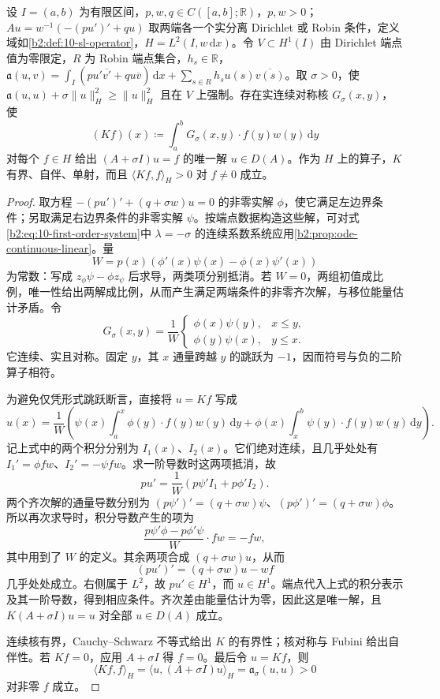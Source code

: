\begin{proposition}[移位 Green 算子]\label{b2:prop:10-green-resolvent}
设 \(I=(a,b)\) 为有限区间，\(p,w,q\in C([a,b];\mathbb R)\)，\(p,w>0\)；\(Au=w^{-1}(-(pu')'+qu)\) 取两端各一个实分离 Dirichlet 或 Robin 条件，定义域如\cref{b2:def:10-sl-operator}，\(H=L^2(I,w\,\mathrm dx)\)。令 \(V\subset H^1(I)\) 由 Dirichlet 端点值为零限定，\(R\) 为 Robin 端点集合，\(h_s\in\mathbb R\)，\(\mathfrak a(u,v)=\int_I(pu'\overline{v'}+qu\overline v)\,\mathrm dx+\sum_{s\in R}h_su(s)\overline{v(s)}\)。取 \(\sigma>0\)，使 \(\mathfrak a(u,u)+\sigma\|u\|_H^2\geq\|u\|_H^2\) 且在 \(V\) 上强制。存在实连续对称核 \(G_\sigma(x,y)\)，使
\[
 (Kf)(x)\coloneqq\int_a^bG_\sigma(x,y)\cdot f(y)w(y)\,\mathrm{d}y
\]
对每个 \(f\in H\) 给出 \((A+\sigma I)u=f\) 的唯一解 \(u\in D(A)\)。作为 \(H\) 上的算子，\(K\) 有界、自伴、单射，而且 \(\langle Kf,f\rangle_H>0\) 对 \(f\ne0\) 成立。
\end{proposition}
\begin{proof}
取方程 \(-(pu')'+(q+\sigma w)u=0\) 的非零实解 \(\phi\)，使它满足左边界条件；另取满足右边界条件的非零实解 \(\psi\)。按端点数据构造这些解，可对式\eqref{b2:eq:10-first-order-system}中 \(\lambda=-\sigma\) 的连续系数系统应用\cref{b2:prop:ode-continuous-linear}。量
\[
 W=p(x)\left(\phi'(x)\psi(x)-\phi(x)\psi'(x)\right)
\]
为常数：写成 \(z_\phi\psi-\phi z_\psi\) 后求导，两类项分别抵消。若 \(W=0\)，两组初值成比例，唯一性给出两解成比例，从而产生满足两端条件的非零齐次解，与移位能量估计矛盾。令
\[
 G_\sigma(x,y)=\dfrac1W
 \begin{cases}
 \phi(x)\psi(y),&x\leq y,\\
 \phi(y)\psi(x),&y\leq x.
 \end{cases}
\]
它连续、实且对称。固定 \(y\)，其 \(x\) 通量跨越 \(y\) 的跳跃为 \(-1\)，因而符号与负的二阶算子相符。

为避免仅凭形式跳跃断言，直接将 \(u=Kf\) 写成
\[
 u(x)=\dfrac1W\left(
 \psi(x)\int_a^x\phi(y)\cdot f(y)w(y)\,\mathrm{d}y
 +\phi(x)\int_x^b\psi(y)\cdot f(y)w(y)\,\mathrm{d}y\right).
\]
记上式中的两个积分分别为 \(I_1(x)\)、\(I_2(x)\)。它们绝对连续，且几乎处处有 \(I_1'=\phi fw\)、\(I_2'=-\psi fw\)。求一阶导数时这两项抵消，故
\[
 pu'=\dfrac1W\left(p\psi'I_1+p\phi'I_2\right).
\]
两个齐次解的通量导数分别为 \((p\psi')'=(q+\sigma w)\psi\)、\((p\phi')'=(q+\sigma w)\phi\)。所以再次求导时，积分导数产生的项为
\[
 \dfrac{p\psi'\phi-p\phi'\psi}{W}\cdot fw=-fw,
\]
其中用到了 \(W\) 的定义。其余两项合成 \((q+\sigma w)u\)，从而
\[
 (pu')'=(q+\sigma w)u-wf
\]
几乎处处成立。右侧属于 \(L^2\)，故 \(pu'\in H^1\)，而 \(u\in H^1\)。端点代入上式的积分表示及其一阶导数，得到相应条件。齐次差由能量估计为零，因此这是唯一解，且 \(K(A+\sigma I)u=u\) 对全部 \(u\in D(A)\) 成立。

连续核有界，Cauchy--Schwarz 不等式给出 \(K\) 的有界性；核对称与 Fubini 给出自伴性。若 \(Kf=0\)，应用 \(A+\sigma I\) 得 \(f=0\)。最后令 \(u=Kf\)，则
\[
 \langle Kf,f\rangle_H
 =\langle u,(A+\sigma I)u\rangle_H
 =\mathfrak a_\sigma(u,u)>0
\]
对非零 \(f\) 成立。
\end{proof}

